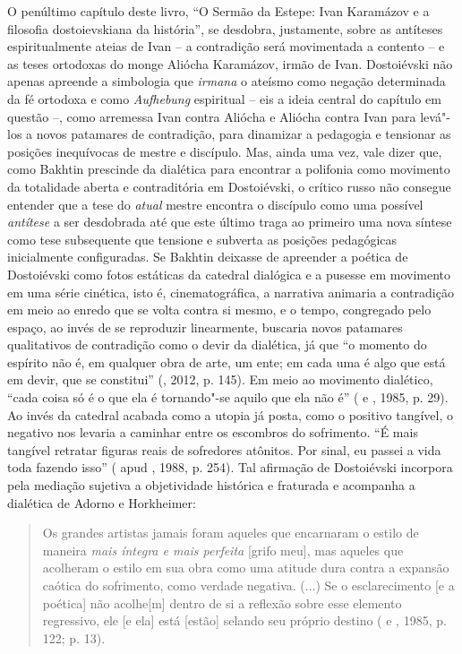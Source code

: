 {{O penúltimo capítulo deste livro, ``O Sermão da Estepe: Ivan Karamázov e
a filosofia dostoievskiana da história'', se desdobra, justamente, sobre
as antíteses espiritualmente ateias de Ivan -- a contradição será
movimentada a contento -- e as teses ortodoxas do monge Aliócha
Karamázov, irmão de Ivan. Dostoiévski não apenas apreende a simbologia
que \emph{irmana} o ateísmo como negação determinada da fé ortodoxa e
como \emph{Aufhebung} espiritual -- eis a ideia central do capítulo em
questão --, como arremessa Ivan contra Aliócha e Aliócha contra Ivan
para levá"-los a novos patamares de contradição, para dinamizar a
pedagogia e tensionar as posições inequívocas de mestre e discípulo.
Mas, ainda uma vez, vale dizer que, como Bakhtin prescinde da dialética
para encontrar a polifonia como movimento da totalidade aberta e
contraditória em Dostoiévski, o crítico russo não consegue entender que
a tese do \emph{atual} mestre encontra o discípulo como uma possível
\emph{antítese} a ser desdobrada até que este último traga ao primeiro
uma nova síntese como tese subsequente que tensione e subverta as
posições pedagógicas inicialmente configuradas. Se Bakhtin deixasse de
apreender a poética de Dostoiévski como fotos estáticas da catedral
dialógica e a pusesse em movimento em uma série cinética, isto é,
cinematográfica, a narrativa animaria a contradição em meio ao enredo
que se volta contra si mesmo, e o tempo, congregado pelo espaço, ao
invés de se reproduzir linearmente, buscaria novos patamares
qualitativos de contradição como o devir da dialética, já que ``o
momento do espírito não é, em qualquer obra de arte, um ente; em cada
uma é algo que está em devir, que se constitui'' (, 2012, p. 145).
Em meio ao movimento dialético, ``cada coisa só é o que ela é
tornando"-se aquilo que ela não é'' ( e , 1985, p. 29).
Ao invés da catedral acabada como a utopia já posta, como o positivo
tangível, o negativo nos levaria a caminhar entre os escombros do
sofrimento. ``É mais tangível retratar figuras reais de sofredores
atônitos. Por sinal, eu passei a vida toda fazendo isso'' (
apud , 1988, p. 254). Tal afirmação de Dostoiévski incorpora pela
mediação sujetiva a objetividade histórica e fraturada e acompanha a
dialética de Adorno e Horkheimer:

\begin{quote}
Os grandes artistas jamais foram aqueles que encarnaram o estilo de
maneira \emph{mais íntegra e mais perfeita} {[}grifo meu{]}, mas aqueles
que acolheram o estilo em sua obra como uma atitude dura contra a
expansão caótica do sofrimento, como verdade negativa. (...) Se o
esclarecimento {[}e a poética{]} não acolhe{[}m{]} dentro de si a
reflexão sobre esse elemento regressivo, ele {[}e ela{]} está
{[}estão{]} selando seu próprio destino ( e , 1985, p.
122; p. 13).
\end{quote}

}}
